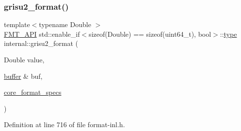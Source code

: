 \subsubsection{\texorpdfstring{grisu2\+\_\+format()}{grisu2\_format()}\hspace{0.1cm}{\footnotesize\ttfamily [2/3]}}
{\footnotesize\ttfamily template$<$typename Double $>$ \\
\hyperlink{core_8h_a9a4960b70582ed2620911a0b75dce0b5}{F\+M\+T\+\_\+\+A\+PI} std\+::enable\+\_\+if$<$sizeof(Double) == sizeof(uint64\+\_\+t), bool$>$\+::\hyperlink{namespaceinternal_a8661864098ac0acff9a6dd7e66f59038}{type} internal\+::grisu2\+\_\+format (\begin{DoxyParamCaption}\item[{Double}]{value,  }\item[{\hyperlink{namespaceinternal_a5fcdbc3efad1f390e6c3f0fdafa56122}{buffer} \&}]{buf,  }\item[{\hyperlink{structcore__format__specs}{core\+\_\+format\+\_\+specs}}]{ }\end{DoxyParamCaption})\hspace{0.3cm}{\ttfamily [inline]}}



Definition at line 716 of file format-\/inl.\+h.

